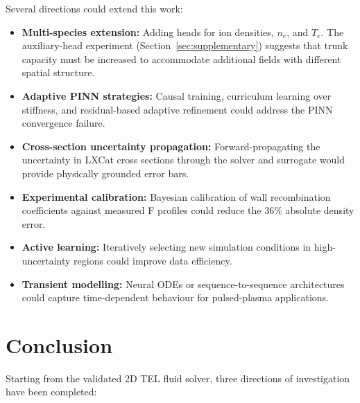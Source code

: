 \documentclass[12pt,a4paper]{article}
\begin{document}
Several directions could extend this work:

\begin{itemize}
  \item \textbf{Multi-species extension:} Adding heads for ion
        densities, $n_e$, and $T_e$.  The auxiliary-head experiment
        (Section~\ref{sec:supplementary}) suggests that trunk capacity
        must be increased to accommodate additional fields with
        different spatial structure.

  \item \textbf{Adaptive PINN strategies:}  Causal training,
        curriculum learning over stiffness, and residual-based
        adaptive refinement could address the PINN convergence failure.

  \item \textbf{Cross-section uncertainty propagation:}
        Forward-propagating the uncertainty in LXCat cross sections
        through the solver and surrogate would provide physically
        grounded error bars.

  \item \textbf{Experimental calibration:}  Bayesian calibration
        of wall recombination coefficients against measured F profiles
        could reduce the 36\% absolute density error.

  \item \textbf{Active learning:}  Iteratively selecting new
        simulation conditions in high-uncertainty regions could improve
        data efficiency.

  \item \textbf{Transient modelling:}  Neural ODEs or
        sequence-to-sequence architectures could capture time-dependent
        behaviour for pulsed-plasma applications.
\end{itemize}

\section{Conclusion}
\label{sec:conclusion}

Starting from the validated 2D TEL fluid solver, three directions of
investigation have been completed:
\end{document}
